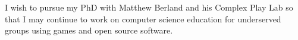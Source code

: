 \documentclass[12pt]{letter}
\begin{document}
\begin{letter}
I wish to pursue my PhD with Matthew Berland and his Complex Play Lab so that I may continue to work on computer science education for underserved groups using games and open source software. 






\end{letter}
\end{document}
